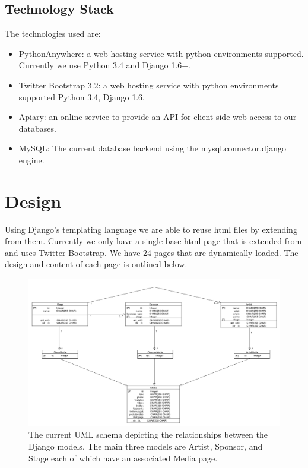 \documentclass[12pt,english]{scrartcl}
\begin{document}
\subsection{Technology Stack}
The technologies used are:
\begin{itemize}
 \item PythonAnywhere: a web hosting service with python environments supported. Currently we use Python 3.4 and Django 1.6+.
\end{itemize}
\begin{itemize}
 \item Twitter Bootstrap 3.2: a web hosting service with python environments supported Python 3.4, Django 1.6.
\end{itemize}
\begin{itemize}
 \item Apiary: an online service to provide an API for client-side web access to our databases.
\end{itemize}
\begin{itemize}
 \item MySQL: The current database backend using the mysql.connector.django engine.
\end{itemize}

\section{Design}

Using Django's templating language we are able to reuse html files by extending from them. Currently we only have a single base html page that is extended from and 
uses Twitter Bootstrap. We have 24 pages that are dynamically loaded. The design and content of each page is outlined below.
\begin{figure}[h!]
\includegraphics[width=\textwidth]{UML.png}
 \caption{The current UML schema depicting the relationships between the Django models. The main three models are Artist, Sponsor, and Stage each of which have an associated Media page.}
\end{figure}
\end{document}
